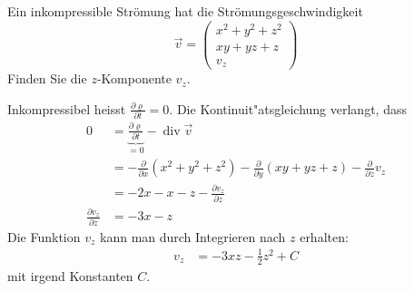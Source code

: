 Ein inkompressible Strömung hat die Strömungsgeschwindigkeit
\[
\vec v = \begin{pmatrix}
x^2+y^2+z^2
\\
xy+yz+z
\\
v_z
\end{pmatrix}
\]
Finden Sie die $z$-Komponente $v_z$.

\begin{loesung}
Inkompressibel heisst $\frac{\partial\varrho}{\partial t}=0$.
Die Kontinuit"atsgleichung verlangt, dass
\begin{align*}
0
&=
\underbrace{\frac{\partial\varrho}{\partial t}}_{=0}-\operatorname{div}\vec v
\\
&=
-\frac{\partial}{\partial x}(x^2+y^2+z^2)
-\frac{\partial}{\partial y}(xy+yz+z)
-\frac{\partial}{\partial z}v_z
\\
&=
-2x-x-z-\frac{\partial v_z}{\partial z}
\\
\frac{\partial v_z}{\partial z}
&=
-3x-z
\end{align*}
Die Funktion $v_z$ kann man durch Integrieren nach $z$ erhalten:
\begin{align*}
v_z
&=
-3xz-\frac12z^2+C
\end{align*}
mit irgend Konstanten $C$.
\end{loesung}

